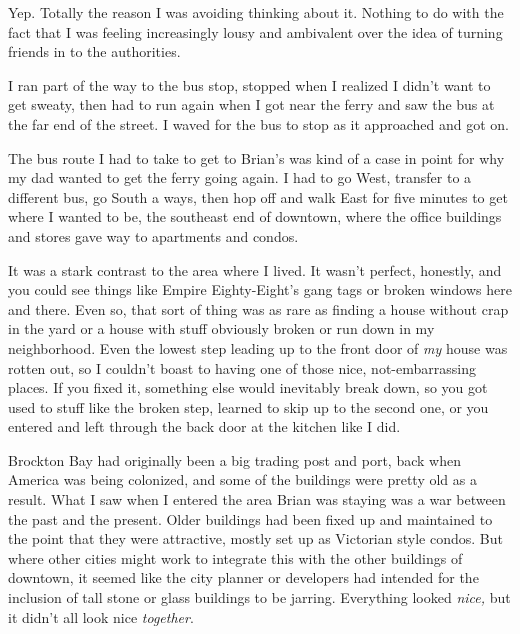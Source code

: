 Yep.  Totally the reason I was avoiding thinking about it.  Nothing to do with the fact that I was feeling increasingly lousy and ambivalent over the idea of turning friends in to the authorities.



I ran part of the way to the bus stop, stopped when I realized I didn't want to get sweaty, then had to run again when I got near the ferry and saw the bus at the far end of the street.  I waved for the bus to stop as it approached and got on.



The bus route I had to take to get to Brian's was kind of a case in point for why my dad wanted to get the ferry going again.  I had to go West, transfer to a different bus, go South a ways, then hop off and walk East for five minutes to get where I wanted to be, the southeast end of downtown, where the office buildings and stores gave way to apartments and condos.



It was a stark contrast to the area where I lived.  It wasn't perfect, honestly, and you could see things like Empire Eighty-Eight's gang tags or broken windows here and there.  Even so, that sort of thing was as rare as finding a house without crap in the yard or a house with stuff obviously broken or run down in my neighborhood. Even the lowest step leading up to the front door of \emph{my} house was rotten out, so I couldn't boast to having one of those nice, not-embarrassing places.  If you fixed it, something else would inevitably break down, so you got used to stuff like the broken step, learned to skip up to the second one, or you entered and left through the back door at the kitchen like I did.



Brockton Bay had originally been a big trading post and port, back when America was being colonized, and some of the buildings were pretty old as a result.  What I saw when I entered the area Brian was staying was a war between the past and the present.  Older buildings had been fixed up and maintained to the point that they were attractive, mostly set up as Victorian style condos.  But where other cities might work to integrate this with the other buildings of downtown, it seemed like the city planner or developers had intended for the inclusion of tall stone or glass buildings to be jarring.  Everything looked \emph{nice, }but it didn't all look nice \emph{together}.



